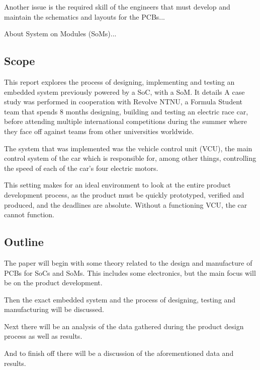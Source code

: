 Another issue is the required skill of the engineers that must develop and maintain the schematics and layouts for the PCBs...

About System on Modules (SoMs)...

\subsection{Scope}

This report explores the process of designing, implementing and testing an embedded system previously powered by a SoC, with a SoM. It details A case study was performed in cooperation with Revolve NTNU, a Formula Student team that spends 8 months designing, building and testing an electric race car, before attending multiple international competitions during the summer where they face off against teams from other universities worldwide. 

The system that was implemented was the vehicle control unit (VCU), the main control system of the car which is responsible for, among other things, controlling the speed of each of the car's four electric motors.

This setting makes for an ideal environment to look at the entire product development process, as the product must be quickly prototyped, verified and produced, and the deadlines are absolute. Without a functioning VCU, the car cannot function.


\subsection{Outline}

The paper will begin with some theory related to the design and manufacture of PCBs for SoCs and SoMs. This includes some electronics, but the main focus will be on the product development.

Then the exact embedded system and the process of designing, testing and manufacturing will be discussed.

Next there will be an analysis of the data gathered during the product design  process as well as results. 

And to finish off there will be a discussion of the aforementioned data and results.